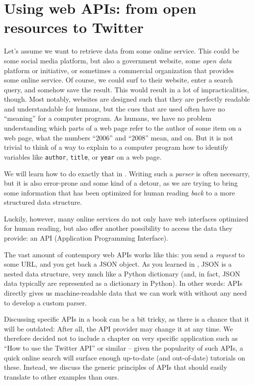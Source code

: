 \section{Using web APIs: from open resources to Twitter}
\label{sec:apis}

Let's assume we want to retrieve data from some online service. This
could be some social media platform, but also a government website,
some \emph{open data} platform or initiative, or sometimes a
commercial organization that provides some online service.  Of course,
we could surf to their website, enter a search query, and somehow save
the result. This would result in a lot of impracticalities,
though. Most notably, websites are designed such that they are
perfectly readable and understandable for humans, but the cues that
are used often have no ``meaning'' for a computer program. As humans,
we have no problem understanding which parts of a web page refer to
the author of some item on a web page, what the numbers ``2006'' and
``2008'' mean, and on. But it is not trivial to think of a way to
explain to a computer program how to identify variables like
\texttt{author}, \texttt{title}, or \texttt{year} on a web page.

We will learn how to do exactly that in . Writing
such a \emph{parser} is often necesarry, but it is also error-prone
and some kind of a detour, as we are trying to bring some information
that has been optimized for human reading \emph{back} to a more
structured data structure. 

Luckily, however, many online services do not only have web interfaces
optimized for human reading, but also offer another possibility to
access the data they provide: an API (Application Programming
Interface).

The vast amount of contempory web APIs works like this: you send a
\emph{request} to some URL, and you get back a JSON object. As you
learned in , JSON is a nested data structure, very
much like a Python dictionary (and, in fact, JSON data typically are
represented as a dictionary in Python). In other words: APIs directly
gives us machine-readable data that we can work with without any need
to develop a custom parser.

Discussing specific APIs in a book can be a bit tricky, as there is a
chance that it will be outdated: After all, the API provider may change
it at any time. We therefore decided not to include a chapter on very
specific application such as ``How to use the Twitter API'' or similar --
given the popularity of such APIs, a quick online search will surface
enough up-to-date (and out-of-date) tutorials on these. Instead,
we discuss the generic principles of APIs that should easily translate
to other examples than ours.



